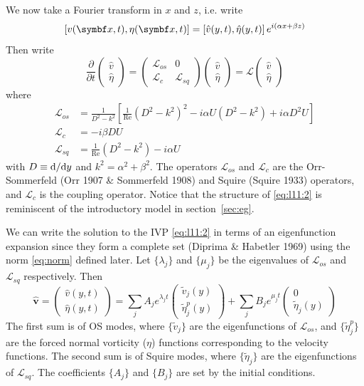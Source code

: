 \documentclass{jknotes}
\newcommand{\ReN}{\text{Re}}
\renewcommand{\L}{\mathcal{L}}
\begin{document}
We now take a Fourier transform in $x$ and $z$, i.e. write
\begin{equation}
	\left[ v(\x,t), \eta(\x,t)\right] = \left[ \hat{v}(y,t),
	\hat{\eta}(y,t)\right] e^{i(\alpha x + \beta z)}
\end{equation}
Then write
\begin{equation}
	\frac{\partial}{\partial t} \begin{pmatrix} \hat{v} \\ \hat{\eta}
		\end{pmatrix} = \begin{pmatrix} \L_{os} & 0 \\ \L_c & \L_{sq}
		\end{pmatrix} \begin{pmatrix} \hat{v} \\ \hat{\eta} \end{pmatrix} = \L
		\begin{pmatrix} \hat{v} \\ \hat{\eta}\end{pmatrix} \label{eq:l11:2}
\end{equation}
where
\begin{align}
	\L_{os} &= \frac{1}{D^2 -k^2} \left[ \frac{1}{\ReN} (D^2-k^2)^2 - i\alpha
	U (D^2-k^2) + i \alpha D^2 U\right] \\
	\L_c &= -i\beta D U \\
	\L_{sq} &= \frac{1}{\ReN} (D^2 - k^2) - i\alpha U
\end{align}
with $D \equiv \diffd/\diffd y$ and $k^2 = \alpha^2 + \beta^2$. The operators
$\L_{os}$ and $\L_c$ are the Orr-Sommerfeld (Orr 1907 \& Sommerfeld 1908) and
Squire (Squire 1933) operators, and $\L_c$ is the coupling operator. Notice
that the structure of \eqref{eq:l11:2} is reminiscent of the introductory
model in section~\ref{sec:eg}. 

We can write the solution to the IVP \eqref{eq:l11:2} in terms of an
eigenfunction expansion since they form a complete set (Diprima \& Habetler
1969) using the norm \eqref{eq:norm} defined later. Let $\{\lambda_j\}$
and $\{\mu_j\}$ be the eigenvalues of $\L_{os}$ and $\L_{sq}$ respectively.
Then
\begin{equation}
	\hat{\symbf{v}} = \begin{pmatrix} \hat{v}(y,t) \\ \hat{\eta}(y,t)
		\end{pmatrix} = \sum_j A_j e^{\lambda_j t} \begin{pmatrix}
	\tilde{v}_j(y) \\ \tilde{\eta}_j^p(y) \end{pmatrix} + \sum_j B_j e^{\mu_j
	t} \begin{pmatrix} 0 \\ \tilde{\eta}_j(y) \end{pmatrix} \label{eq:l11:3}
\end{equation}
The first sum is of OS modes, where $\{\tilde{v}_j\}$ are the
eigenfunctions of $\L_{os}$, and $\{\tilde{\eta}_j^p\}$ are the forced normal
vorticity ($\eta$) functions corresponding to the velocity functions. The
second sum is of Squire modes, where $\{\tilde{\eta}_j\}$ are the
eigenfunctions of $\L_{sq}$. The coefficients $\{A_j\}$ and $\{B_j\}$ are set
by the initial conditions.
\end{document}
